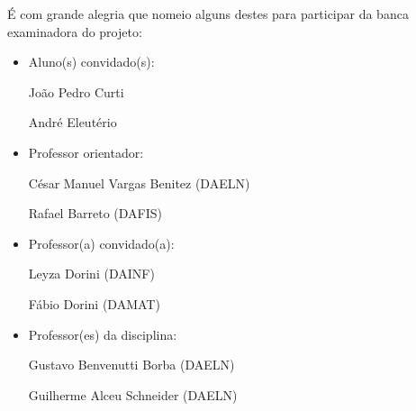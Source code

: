         É com grande alegria que nomeio alguns destes para participar da banca examinadora do projeto:

    \begin{itemize}
        \item Aluno(s) convidado(s):

            \subitem João Pedro Curti

            \subitem André Eleutério

        \item Professor orientador:

            \subitem César Manuel Vargas Benitez (DAELN)

            \subitem Rafael Barreto (DAFIS)

        \item Professor(a) convidado(a):

            \subitem Leyza Dorini (DAINF)

            \subitem Fábio Dorini (DAMAT)

        \item Professor(es) da disciplina:

            \subitem Gustavo Benvenutti Borba (DAELN)

            \subitem Guilherme Alceu Schneider (DAELN)

    \end{itemize} 